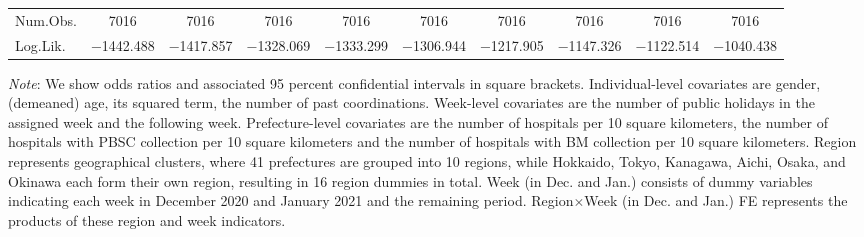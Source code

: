 \documentclass[12pt, a4paper]{article}
\begin{document}
\begin{landscape}
\begin{table}[H]
\begin{threeparttable}
\begin{tabular}[t]{lccccccccc}
Num.Obs. & \num{7016} & \num{7016} & \num{7016} & \num{7016} & \num{7016} & \num{7016} & \num{7016} & \num{7016} & \num{7016}\\
Log.Lik. & \num{-1442.488} & \num{-1417.857} & \num{-1328.069} & \num{-1333.299} & \num{-1306.944} & \num{-1217.905} & \num{-1147.326} & \num{-1122.514} & \num{-1040.438}\\
\bottomrule
\end{tabular}
\begin{tablenotes}
\item \emph{Note}: We show odds ratios and associated 95 percent confidential intervals in square brackets. Individual-level covariates are gender, (demeaned) age, its squared term, the number of past coordinations. Week-level covariates are the number of public holidays in the assigned week and the following week. Prefecture-level covariates are the number of hospitals per 10 square kilometers, the number of hospitals with PBSC collection per 10 square kilometers and the number of hospitals with BM collection per 10 square kilometers. Region represents geographical clusters, where 41 prefectures are grouped into 10 regions, while Hokkaido, Tokyo, Kanagawa, Aichi, Osaka, and Okinawa each form their own region, resulting in 16 region dummies in total. Week (in Dec. and Jan.) consists of dummy variables indicating each week in December 2020 and January 2021 and the remaining period. Region$\times$Week (in Dec. and Jan.) FE represents the products of these region and week indicators.
\end{tablenotes}
\end{threeparttable}
\end{table}
\end{landscape}

\clearpage


\end{document}
